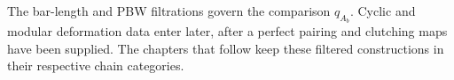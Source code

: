 \documentclass[11pt]{memoir}
\begin{document}











\noindent
The bar-length and PBW filtrations govern the comparison
$q_{A_b}$.  Cyclic and modular deformation data enter later, after a
perfect pairing and clutching maps have been supplied.  The chapters
that follow keep these filtered constructions in their respective
chain categories.





\end{document}
